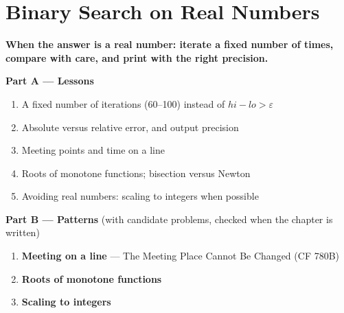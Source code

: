 \chapter{Binary Search on Real Numbers}
\label{ch:real}

\begin{tcolorbox}[enhanced, colback=white, colframe=secondaryblue, boxrule=1pt, arc=2mm]
\textbf{\large\textcolor{primaryblue}{When the answer is a real number: iterate a fixed number of times, compare with care, and print with the right precision.}}
\end{tcolorbox}


\begin{plannedbox}
\textbf{Part A --- Lessons}
\begin{enumerate}[leftmargin=*, label=\textbf{A\arabic*.}, itemsep=1pt]
    \item A fixed number of iterations (60--100) instead of $hi - lo > \varepsilon$
    \item Absolute versus relative error, and output precision
    \item Meeting points and time on a line
    \item Roots of monotone functions; bisection versus Newton
    \item Avoiding real numbers: scaling to integers when possible
\end{enumerate}
\textbf{Part B --- Patterns} (with candidate problems, checked when the chapter is written)
\begin{enumerate}[leftmargin=*, label=\textbf{P\arabic*.}, itemsep=1pt]
    \item \textbf{Meeting on a line} --- The Meeting Place Cannot Be Changed {\small\color{darkgray}(CF 780B)}
    \item \textbf{Roots of monotone functions}
    \item \textbf{Scaling to integers}
\end{enumerate}
\end{plannedbox}
